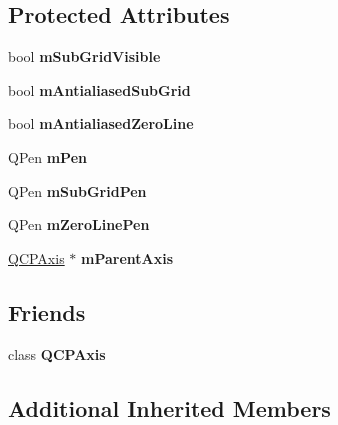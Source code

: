 \subsection*{Protected Attributes}
\begin{DoxyCompactItemize}
\item 
\mbox{\label{class_q_c_p_grid_a4e4a0400d6319bb44c06341f6298c87b}} 
bool {\bfseries m\+Sub\+Grid\+Visible}
\item 
\mbox{\label{class_q_c_p_grid_a71b7051f833f0c5de3094998d6afdd87}} 
bool {\bfseries m\+Antialiased\+Sub\+Grid}
\item 
\mbox{\label{class_q_c_p_grid_a8c0df56ae86440408c050895dcdb922b}} 
bool {\bfseries m\+Antialiased\+Zero\+Line}
\item 
\mbox{\label{class_q_c_p_grid_a1cdc4a3bccf6a40c2d4360def9fefa40}} 
Q\+Pen {\bfseries m\+Pen}
\item 
\mbox{\label{class_q_c_p_grid_aa9004bc139ad3ea92629f0aaae81d83f}} 
Q\+Pen {\bfseries m\+Sub\+Grid\+Pen}
\item 
\mbox{\label{class_q_c_p_grid_a379481871f17655c27eda30af233554f}} 
Q\+Pen {\bfseries m\+Zero\+Line\+Pen}
\item 
\mbox{\label{class_q_c_p_grid_a9a8a76731e6e737b65b929fd1995cc88}} 
\mbox{\hyperlink{class_q_c_p_axis}{Q\+C\+P\+Axis}} $\ast$ {\bfseries m\+Parent\+Axis}
\end{DoxyCompactItemize}
\subsection*{Friends}
\begin{DoxyCompactItemize}
\item 
\mbox{\label{class_q_c_p_grid_af123edeca169ec7a31958a1d714e1a8a}} 
class {\bfseries Q\+C\+P\+Axis}
\end{DoxyCompactItemize}
\subsection*{Additional Inherited Members}


